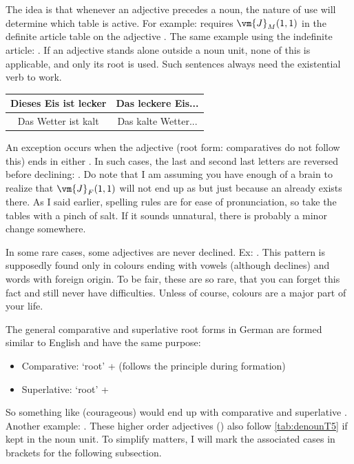 The idea is that whenever an adjective precedes a noun, the nature of use will determine which table is active. For example:  requires $\vm{J}_{M}(1,1)$ in the definite article table on the adjective . The same example using the indefinite article: . If an adjective stands alone outside a noun unit, none of this is applicable, and only its root  is used. Such sentences always need the existential verb  to work.
\begin{example}
    \begin{tabular}{c|c}
        Dieses Eis ist lecker & Das leckere Eis...\\\hline
        Das Wetter ist kalt & Das kalte Wetter...
    \end{tabular}
\end{example}
An exception occurs when the adjective (root form: comparatives do not follow this) ends in either . In such cases, the last and second last letters are reversed before declining: . Do note that I am assuming you have enough of a brain to realize that $\vm{J}_{F}(1,1)$  will not end up as  but just  because an  already exists there. As I said earlier, spelling rules are  for ease of pronunciation, so take the tables with a pinch of salt. If it sounds unnatural, there is probably a minor change somewhere.

In some rare cases, some adjectives are  never declined. Ex: . This pattern is supposedly found only in colours ending with vowels (although  declines) and words with foreign origin. To be fair, these are so rare, that you can forget this fact and still never have difficulties. Unless of course, colours are a major part of your life.

The general  comparative and superlative root forms in German are formed similar to English and have the same purpose:
\begin{itemize}[leftmargin=25pt]
    \item Comparative: `root' +  (follows the  principle during formation)
    \item Superlative:  `root' + 
\end{itemize}
So something like  (courageous) would end up with comparative  and superlative . Another example: . These higher order adjectives () also follow \autoref{tab:denounT5} if kept in the noun unit. To simplify matters, I will mark the associated cases in brackets for the following subsection.

